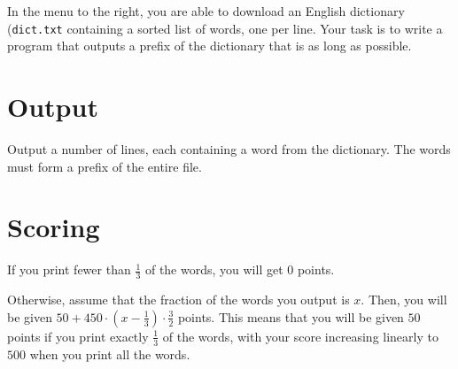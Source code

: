 In the menu to the right, you are able to download an English dictionary (\texttt{dict.txt} containing a sorted list of words, one per line.
Your task is to write a program that outputs a prefix of the dictionary that is as long as possible.

\section*{Output}
Output a number of lines, each containing a word from the dictionary.
The words must form a prefix of the entire file.

\section*{Scoring}
If you print fewer than $\frac{1}{3}$ of the words, you will get 0 points.

Otherwise, assume that the fraction of the words you output is $x$. Then, you will be given $50 + 450 \cdot (x - \frac{1}{3}) \cdot \frac{3}{2}$ points.
This means that you will be given $50$ points if you print exactly $\frac{1}{3}$ of the words, with your score increasing linearly to $500$ when you print all the words.
